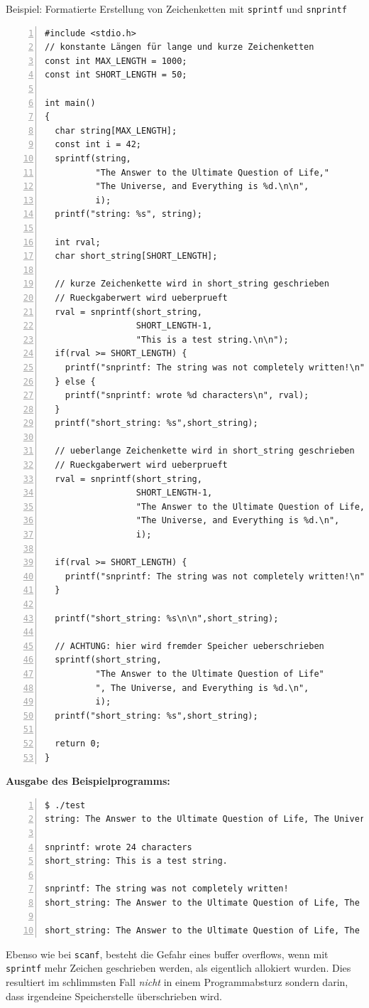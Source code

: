 \begin{myexampleprogram}{Beispiel: Formatierte Erstellung von Zeichenketten mit \texttt{sprintf} und \texttt{snprintf}}
\begin{lstlisting}[numbers=left]
#include <stdio.h>
// konstante Längen für lange und kurze Zeichenketten
const int MAX_LENGTH = 1000;
const int SHORT_LENGTH = 50;

int main()
{
  char string[MAX_LENGTH];
  const int i = 42;
  sprintf(string,
          "The Answer to the Ultimate Question of Life,"
          "The Universe, and Everything is %d.\n\n",
          i);
  printf("string: %s", string);
  
  int rval;
  char short_string[SHORT_LENGTH];
  
  // kurze Zeichenkette wird in short_string geschrieben
  // Rueckgaberwert wird ueberprueft
  rval = snprintf(short_string, 
                  SHORT_LENGTH-1, 
                  "This is a test string.\n\n");
  if(rval >= SHORT_LENGTH) {
    printf("snprintf: The string was not completely written!\n");
  } else {
    printf("snprintf: wrote %d characters\n", rval);
  }
  printf("short_string: %s",short_string);
  
  // ueberlange Zeichenkette wird in short_string geschrieben
  // Rueckgaberwert wird ueberprueft
  rval = snprintf(short_string, 
                  SHORT_LENGTH-1, 
                  "The Answer to the Ultimate Question of Life, "
                  "The Universe, and Everything is %d.\n", 
                  i);
                  
  if(rval >= SHORT_LENGTH) {
    printf("snprintf: The string was not completely written!\n");
  }
  
  printf("short_string: %s\n\n",short_string);
  
  // ACHTUNG: hier wird fremder Speicher ueberschrieben 
  sprintf(short_string, 
          "The Answer to the Ultimate Question of Life"
          ", The Universe, and Everything is %d.\n",
          i);
  printf("short_string: %s",short_string); 
  
  return 0;
}
\end{lstlisting}
\noindent \textbf{Ausgabe des Beispielprogramms:}
{\footnotesize
\begin{lstlisting}[numbers=left]
$ ./test
string: The Answer to the Ultimate Question of Life, The Universe, and Everything is 42.

snprintf: wrote 24 characters
short_string: This is a test string.

snprintf: The string was not completely written!
short_string: The Answer to the Ultimate Question of Life, The

short_string: The Answer to the Ultimate Question of Life, The Universe, and Everything is 42.
\end{lstlisting}
}

\end{myexampleprogram}
Ebenso wie bei \texttt{scanf}, besteht die Gefahr eines buffer overflows, wenn mit \texttt{sprintf} mehr Zeichen geschrieben werden, als eigentlich allokiert wurden.
Dies resultiert im schlimmsten Fall \emph{nicht} in einem Programmabsturz sondern darin, dass irgendeine Speicherstelle überschrieben wird.

